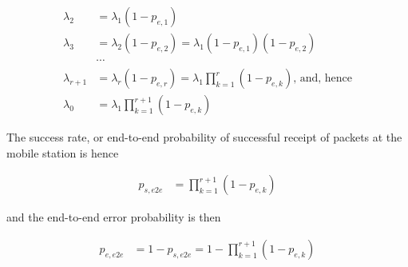 \begin{align*}
  \lambda_2 &= \lambda_1 (1 - p_{e,1}) \\
  \lambda_3 &= \lambda_2 (1 - p_{e,2}) = \lambda_1 (1 - p_{e,1}) (1 - p_{e,2}) \\
  & \cdots \\
  \lambda_{r+1} &= \lambda_r (1-p_{e,r}) = \lambda_1 \prod_{k=1}^{r} (1 - p_{e,k})
  \text{, and, hence} \\
  \lambda_0 &= \lambda_1 \prod_{k=1}^{r+1} (1 - p_{e,k})
\end{align*}

The success rate, or end-to-end probability of successful receipt of packets at
the mobile station is hence

\begin{align*}
  p_{s,e2e} &= \prod_{k=1}^{r+1} (1 - p_{e,k})
\end{align*}

and the end-to-end error probability is then

\begin{align*}
  p_{e,e2e} &= 1 - p_{s,e2e} = 1 - \prod_{k=1}^{r+1} (1 - p_{e,k})
\end{align*}
